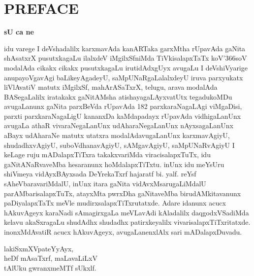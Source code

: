 \chapter{{\rm\bfseries PREFACE}}

\begin{center}
{\LARGE\bfseries sU ca ne}
\end{center}

idu varege I deVshadalilx karxmavAda kanARTaka garxMtha rUpavAda gaNita shAsatxrX pusutxkagaLu ilalxdeV iMgilxSf\-niMda TiVkisalapxTaTx koV\char'366soV modalAda cikakx cikakx pusutxkagaLu irutidAdxgUyx avugaLu I deVshiVyarige anupayoVgavAgi baLikeyAgadeyU, saMpUNaRgaLalalxdeyU iruva parxyukatx liVlAvatiV matutx iMgilxSf, mahArASaTxrX, telugu, arava modalAda BASegaLalilx iratakakx gaNitAMsha atishayagaLAyxvatUtx tegadukoMDu avugaLanunx gaNita parxBeVda rUpavAda {\rm 182} parxkaraNagaLAgi viMgaDisi, parxti parxkaraNagaLigU kananxDa kaMdapadayx rUpavAda vidhigaLanUnx avugaLa athaR vivaraNegaLanUnx udAharaNegaLanUnx nAyxsagaLanUnx aBayx udAharaNe matutx utatxra modalAdavugaLanUnx karxmavAgiyU, shudadhxvAgiyU, suboVdhanavAgiyU, sAMgavAgiyU, saMpUNaRvAgiyU I keLage ruju mADalapxTiTxra takakxvariMda viracisalapxTuTx, idu gaNitANaRvaveMba hesaranunx hoMdalapxTiTxtu. inUnx idu meYsUru shiVmeya vidAyxBAyxsada DeYrekaTxrf hajaratf bi. yalf. reYsf sAheVbaravariMdalU, inUnx itara gaNita vidAvxMsarugaLiMdalU parAMbarisalapxTuTx, atayxMta pwrxDha gaNitaveMba birudAMkitavanunx paDiyalapxTaTx meVle mudirxsalapxTiTxrutatxde. Adare idanunx acucx hAkuvAgeyx karaNadi sAmagirxgaLa meVLavAdi kAladalilx daqgodxVSadiMda kelavu akaSxragaLu shudAdhx shudadhx patirxkeyalilx vivarisalapxTiTxritatxde. inonxMdAvatiR acucx hAkuvAgeyx, avugaLanenxlAlx sari mADalapxDuvadu.
\bigskip

\begin{flushright}
lakiSxmXVpateYyAyx,\\
heDf mAsaTxrf, maLavaLiLxV\\
tAlUku gwranxmeMTf sUkxlf.
\end{flushright}
